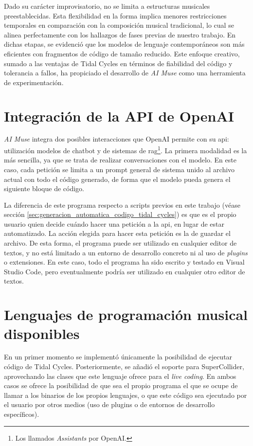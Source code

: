 Dado su carácter improvisatorio, no se limita a estructuras musicales preestablecidas. Esta flexibilidad en la forma implica menores restricciones temporales en comparación con la composición musical tradicional, lo cual se alinea perfectamente con los hallazgos de fases previas de nuestro trabajo. En dichas etapas, se evidenció que los modelos de lenguaje contemporáneos son más eficientes con fragmentos de código de tamaño reducido. Este enfoque creativo, sumado a las ventajas de Tidal Cycles en términos de fiabilidad del código y tolerancia a fallos, ha propiciado el desarrollo de \emph{AI Muse} como una herramienta de experimentación.


\section{Integración de la API de OpenAI}

\emph{AI Muse} integra dos posibles interacciones que OpenAI permite con su \gls{api}: utilización modelos de chatbot y de sistemas de \gls{rag}\footnote{Los llamados \emph{Assistants} por OpenAI.}. La primera modalidad es la más sencilla, ya que se trata de realizar conversaciones con el modelo. En este caso, cada petición se limita a un prompt general de sistema unido al archivo actual con todo el código generado, de forma que el modelo pueda genera el siguiente bloque de código.

La diferencia de este programa respecto a scripts previos en este trabajo (véase sección \ref{sec:generacion_automatica_codigo_tidal_cycles}) es que es el propio usuario quien decide cuándo hacer una petición a la \gls{api}, en lugar de estar automatizado. La acción elegida para hacer esta petición es la de guardar el archivo. De esta forma, el programa puede ser utilizado en cualquier editor de textos, y no está limitado a un entorno de desarrollo concreto ni al uso de \emph{plugins} o extensiones. En este caso, todo el programa ha sido escrito y testado en Visual Studio Code, pero eventualmente podría ser utilizado en cualquier otro editor de textos.


\section{Lenguajes de programación musical disponibles}

En un primer momento se implementó únicamente la posibilidad de ejecutar código de Tidal Cycles. Posteriormente, se añadió el soporte para SuperCollider, aprovechando las clases que este lenguaje ofrece para el \emph{live coding}. En ambos casos se ofrece la posibilidad de que sea el propio programa el que se ocupe de llamar a los binarios de los propios lenguajes, o que este código sea ejecutado por el usuario por otros medios (uso de plugins o de entornos de desarrollo específicos).


